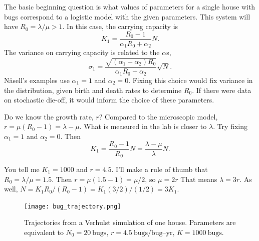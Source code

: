 \documentclass{article}
\begin{document}
The basic beginning question is what values of parameters for
a single house with bugs correspond to a logistic model with the given
parameters. This system will have $R_0=\lambda/\mu>1$. In this
case, the carrying capacity is
\begin{equation}
  K_1=\frac{R_0-1}{\alpha_1 R_0+\alpha_2}N.
\end{equation}
The variance on carrying capacity is related to the $\alpha$s,
\begin{equation}
  \sigma_1=\frac{\sqrt{(\alpha_1+\alpha_2)R_0}}{\alpha_1R_0+\alpha_2}\sqrt{N}.
\end{equation}
N{\aa}sell's examples use $\alpha_1=1$ and $\alpha_2=0$. 
Fixing this choice would fix variance in the distribution, given birth
and death rates to determine $R_0$. If there were data on stochastic die-off,
it would inform the choice of these parameters.

Do we know the growth rate, $r$? Compared to the microscopic model,
$r=\mu(R_0-1)=\lambda-\mu$. What is measured in the lab is closer to $\lambda$.
Try fixing $\alpha_1=1$ and $\alpha_2=0$. Then
\begin{equation}
  K_1=\frac{R_0-1}{R_0}N=\frac{\lambda-\mu}{\lambda}N.
\end{equation}

You tell me $K_1=1000$ and $r=4.5$. I'll make a rule
of thumb that $R_0=\lambda/\mu=1.5$. Then $r=\mu(1.5-1)=\mu/2$,
so $\mu=2r$ That means $\lambda=3r$. As well,
$N=K_1 R_0/(R_0-1)=K_1 (3/2)/(1/2)=3K_1$.


\begin{figure}
\centerline{\texttt{[image: bug\_trajectory.png]}}
\caption{Trajectories from a Verhulst simulation of one
house. Parameters are equivalent to
$N_0=20\:\mbox{bugs}$, $r=4.5\:\mbox{bugs/bug--yr}$, $K=1000\:\mbox{bugs}.$\label{fig:bug_trajectory}}
\end{figure}



\end{document}
